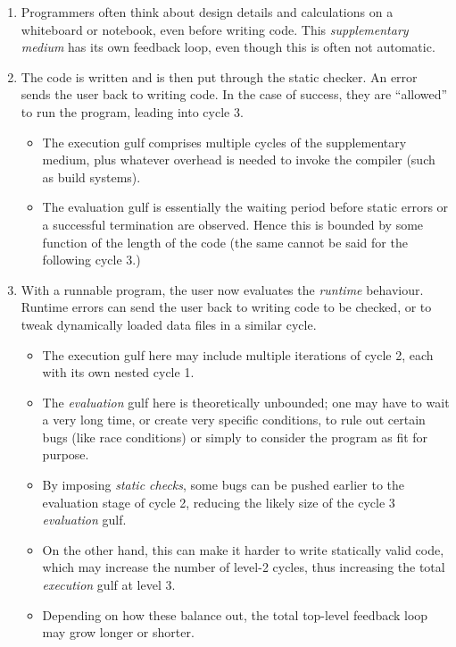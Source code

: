 \documentclass[ twoside,openright,titlepage,numbers=noenddot,headinclude,footinclude,cleardoublepage=empty,abstract=on,
                BCOR=5mm,paper=a4,fontsize=11pt
                ]{scrreprt}
\providecommand{\tightlist}{}\newenvironment{longtable}[2]{\begin{tabular}}{\end{tabular}}
\theoremstyle{definition}
\begin{document}
\begin{enumerate}
\def\labelenumi{\arabic{enumi}.}
\item
  Programmers often think about design details and calculations on a
  whiteboard or notebook, even before writing code. This
  \emph{supplementary medium} has its own feedback loop, even though
  this is often not automatic.
\item
  The code is written and is then put through the static checker. An
  error sends the user back to writing code. In the case of success,
  they are ``allowed'' to run the program, leading into cycle 3.

  \begin{itemize}
  \tightlist
  \item
    The execution gulf comprises multiple cycles of the supplementary
    medium, plus whatever overhead is needed to invoke the compiler
    (such as build systems).
  \item
    The evaluation gulf is essentially the waiting period before static
    errors or a successful termination are observed. Hence this is
    bounded by some function of the length of the code (the same cannot
    be said for the following cycle 3.)
  \end{itemize}
\item
  With a runnable program, the user now evaluates the \emph{runtime}
  behaviour. Runtime errors can send the user back to writing code to be
  checked, or to tweak dynamically loaded data files in a similar cycle.

  \begin{itemize}
  \tightlist
  \item
    The execution gulf here may include multiple iterations of cycle 2,
    each with its own nested cycle 1.
  \item
    The \emph{evaluation} gulf here is theoretically unbounded; one may
    have to wait a very long time, or create very specific conditions,
    to rule out certain bugs (like race conditions) or simply to
    consider the program as fit for purpose.
  \item
    By imposing \emph{static checks}, some bugs can be pushed earlier to
    the evaluation stage of cycle 2, reducing the likely size of the
    cycle 3 \emph{evaluation} gulf.
  \item
    On the other hand, this can make it harder to write statically valid
    code, which may increase the number of level-2 cycles, thus
    increasing the total \emph{execution} gulf at level 3.
  \item
    Depending on how these balance out, the total top-level feedback
    loop may grow longer or shorter.
  \end{itemize}
\end{enumerate}
\end{document}
